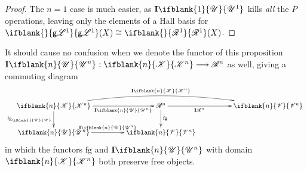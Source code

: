 \documentclass[10pt]{article}
\newcommand{\GoodLie}[1]{\mathsf{g}{\scrL}^{#1}}%
\newcommand{\PRLie}[1]{\scrR^{#1}}%
\newcommand{\LL}[1]{\ifblank{#1}{\scrK}{\scrK^{#1}}}
\newcommand{\GR}[1]{\ifblank{#1}{\scrV}{\scrV^{#1}}}
\newcommand{\nontop}[1]{\ifblank{#1}{\scrU}{\scrU^{#1}}}
\newcommand{\Ind}[2][]{\mathbf{I}{#2}_{#1}}%
\newcommand{\forget}{\mathrm{fg}}
\newcommand{\Fr}[2][]{\ifblank{#1}{#2}{#2_{#1}}}
\newcommand{\restn}[2][]{\ifblank{#1}{\xi{#2}}{\xi_{#1}{#2}}}%
\renewcommand{\Q}{Q}
\begin{document}
\begin{DiagramOfFunctors}
\begin{proof}
The $n=1$ case is much easier, as $\Ind{\nontop{1}}$ kills \emph{all} the $P$ operations, leaving only the elements of a Hall basis for $\Fr{\GoodLie{1}}(X)\cong \Fr{\PRLie{1}}(X)$.
\end{proof}
\noindent It should cause no confusion when we denote the functor of this proposition $\Ind{\nontop{n}}:\LL{n}\to \PRLie{n}$ as well, giving a commuting diagram
\[\xymatrix@R=8mm@C=15mm@!C{
\LL{n}
\ar@/^1.5em/[rr]^-{\Ind{\LL{n}}}
\ar[d]_-{\forget_{\nontop{}}}
\ar@{->}[r]_-{\Ind{\nontop{n}}}
&%
\PRLie{n}
\ar[d]^-{\forget}
\ar[r]_-{\Ind{\PRLie{n}}}
&%
\GR{n}
\\%
\nontop{n}
\ar[r]^-{\Ind{\nontop{n}}}
&%
\GR{n}
&%
}\]
in which the functors $\forget$ and $\Ind{\nontop{n}}$ with domain $\LL{n}$ both preserve free objects.
%
%
\end{DiagramOfFunctors}
\end{document}
